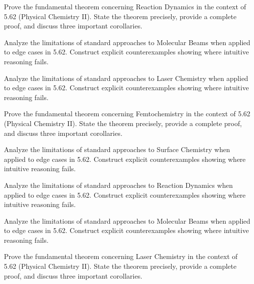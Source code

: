 \documentclass[12pt,a4paper]{exam}
\begin{document}
\begin{questions}

\question[5]
Prove the fundamental theorem concerning Reaction Dynamics in the context of 5.62 (Physical Chemistry II). State the theorem precisely, provide a complete proof, and discuss three important corollaries.

\vspace{0.3cm}

\question[5]
Analyze the limitations of standard approaches to Molecular Beams when applied to edge cases in 5.62. Construct explicit counterexamples showing where intuitive reasoning fails.

\vspace{0.3cm}

\question[4]
Analyze the limitations of standard approaches to Laser Chemistry when applied to edge cases in 5.62. Construct explicit counterexamples showing where intuitive reasoning fails.

\vspace{0.3cm}

\question[3]
Prove the fundamental theorem concerning Femtochemistry in the context of 5.62 (Physical Chemistry II). State the theorem precisely, provide a complete proof, and discuss three important corollaries.

\vspace{0.3cm}

\question[4]
Analyze the limitations of standard approaches to Surface Chemistry when applied to edge cases in 5.62. Construct explicit counterexamples showing where intuitive reasoning fails.

\vspace{0.3cm}

\question[5]
Analyze the limitations of standard approaches to Reaction Dynamics when applied to edge cases in 5.62. Construct explicit counterexamples showing where intuitive reasoning fails.

\vspace{0.3cm}

\question[8]
Analyze the limitations of standard approaches to Molecular Beams when applied to edge cases in 5.62. Construct explicit counterexamples showing where intuitive reasoning fails.

\vspace{0.3cm}

\question[2]
Prove the fundamental theorem concerning Laser Chemistry in the context of 5.62 (Physical Chemistry II). State the theorem precisely, provide a complete proof, and discuss three important corollaries.


\end{questions}
\end{document}
